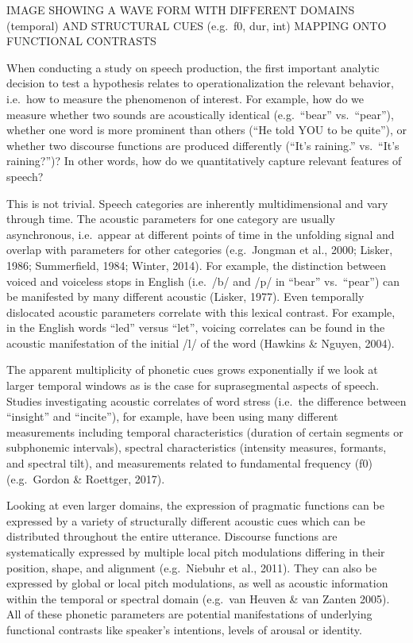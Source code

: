 \documentclass[
  english,
  man]{apa6}
\begin{document}
IMAGE SHOWING A WAVE FORM WITH DIFFERENT DOMAINS (temporal) AND STRUCTURAL CUES (e.g.~f0, dur, int) MAPPING ONTO FUNCTIONAL CONTRASTS

When conducting a study on speech production, the first important analytic decision to test a hypothesis relates to operationalization the relevant behavior, i.e.~how to measure the phenomenon of interest. For example, how do we measure whether two sounds are acoustically identical (e.g.~\enquote{bear} vs.~\enquote{pear}), whether one word is more prominent than others (\enquote{He told YOU to be quite}), or whether two discourse functions are produced differently (\enquote{It's raining.} vs.~\enquote{It's raining?})? In other words, how do we quantitatively capture relevant features of speech?

This is not trivial. Speech categories are inherently multidimensional and vary through time. The acoustic parameters for one category are usually asynchronous, i.e.~appear at different points of time in the unfolding signal and overlap with parameters for other categories (e.g.~Jongman et al., 2000; Lisker, 1986; Summerfield, 1984; Winter, 2014). For example, the distinction between voiced and voiceless stops in English (i.e.~/b/ and /p/ in \enquote{bear} vs.~\enquote{pear}) can be manifested by many different acoustic (Lisker, 1977). Even temporally dislocated acoustic parameters correlate with this lexical contrast. For example, in the English words \enquote{led} versus \enquote{let}, voicing correlates can be found in the acoustic manifestation of the initial /l/ of the word (Hawkins \& Nguyen, 2004).

The apparent multiplicity of phonetic cues grows exponentially if we look at larger temporal windows as is the case for suprasegmental aspects of speech. Studies investigating acoustic correlates of word stress (i.e.~the difference between \enquote{insight} and \enquote{incite}), for example, have been using many different measurements including temporal characteristics (duration of certain segments or subphonemic intervals), spectral characteristics (intensity measures, formants, and spectral tilt), and measurements related to fundamental frequency (f0) (e.g.~Gordon \& Roettger, 2017).

Looking at even larger domains, the expression of pragmatic functions can be expressed by a variety of structurally different acoustic cues which can be distributed throughout the entire utterance. Discourse functions are systematically expressed by multiple local pitch modulations differing in their position, shape, and alignment (e.g.~Niebuhr et al., 2011). They can also be expressed by global or local pitch modulations, as well as acoustic information within the temporal or spectral domain (e.g.~van Heuven \& van Zanten 2005). All of these phonetic parameters are potential manifestations of underlying functional contrasts like speaker's intentions, levels of arousal or identity.
\end{document}

